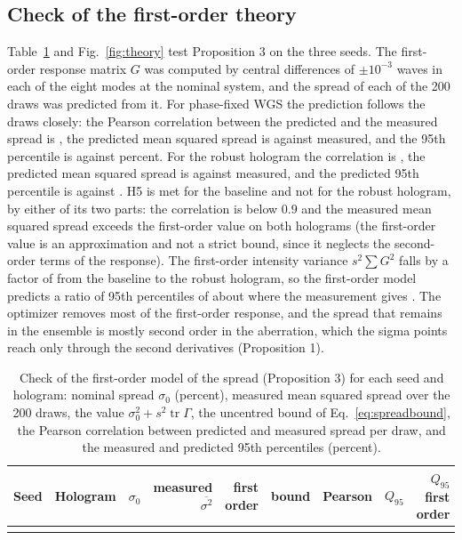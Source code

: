 \subsection{Check of the first-order theory}

Table~\ref{tab:theory} and Fig.~\ref{fig:theory} test Proposition 3 on the three seeds. The first-order response matrix $G$ was computed by central differences of $\pm10^{-3}$ waves in each of the eight modes at the nominal system, and the spread of each of the 200 draws was predicted from it. For phase-fixed WGS the prediction follows the draws closely: the Pearson correlation between the predicted and the measured spread is \thPearsonNom, the predicted mean squared spread is \thPredSqNom{} against \thMeasSqNom{} measured, and the 95th percentile is \thQLinNom{} against \thQMeasNom{} percent. For the robust hologram the correlation is
\thPearsonBfour, the predicted mean squared spread is \thPredSqBfour{} against \thMeasSqBfour{} measured, and the predicted 95th percentile is \thQLinBfour{} against \thQMeasBfour{}. H5 is met for the baseline and not for the robust hologram, by either of its two parts: the correlation is below $0.9$ and the measured mean squared spread exceeds the first-order value on both holograms (the first-order value is an approximation and not a strict bound, since it neglects the second-order terms of the response).
The first-order intensity variance $s^2\sum G^2$ falls by a factor of \thPRatio{} from the baseline to the robust hologram, so the first-order model predicts a ratio of 95th percentiles of about \thQLinRatio{} where the measurement gives \ratioMed. The optimizer removes most of the first-order response, and the spread that remains in the ensemble is mostly second order in the aberration, which the sigma points reach only through the second derivatives (Proposition 1).

\begin{table}[t]
\centering\small
\caption{Check of the first-order model of the spread (Proposition 3) for each seed and hologram: nominal spread $\sigma_0$ (percent), measured mean squared spread over the 200 draws, the value $\sigma_0^2+s^2\operatorname{tr}\Gamma$, the uncentred bound of Eq.~\eqref{eq:spreadbound}, the Pearson correlation between predicted and measured spread per draw, and the measured and predicted 95th percentiles (percent).}
\label{tab:theory}
\small
\begin{tabular}{@{}r l r r r r r r r@{}}
\toprule
Seed & Hologram & $\sigma_0$ & measured $\overline{\sigma^2}$ & first order & bound & Pearson & $Q_{95}$ & $Q_{95}$ first order\\
\midrule
\\
\bottomrule
\end{tabular}
\end{table}

